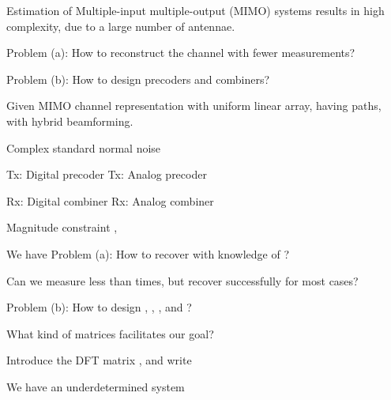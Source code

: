 
\Title {\TitleText}
\blank [big]

\Subtitle {\AuthorText}
\blank [big]

\Subsubtitle {\InstitutionText}

\page [yes]
{
\blank [big]

\I Estimation of Multiple-input multiple-output (MIMO) systems results in high complexity, due to a large number of antennae.

\I Problem (a): How to reconstruct the channel with fewer measurements?

\I Problem (b): How to design precoders and combiners?
}
{
\I Given MIMO channel representation  with uniform linear array, having  paths, with hybrid beamforming.

\I Complex standard normal noise 

\I Tx: Digital precoder 
\I Tx: Analog precoder 

\I Rx: Digital combiner 
\I Rx: Analog combiner 

\I Magnitude constraint , 
}
{
\I We have 
%
\I Problem (a): How to recover  with knowledge of ?

\I Can we measure less than  times, but recover successfully for most cases?

\I Problem (b): How to design , , , and ?

\I What kind of matrices facilitates our goal?
}
{
\I Introduce the DFT matrix , and write

\I We have an underdetermined system 
}
